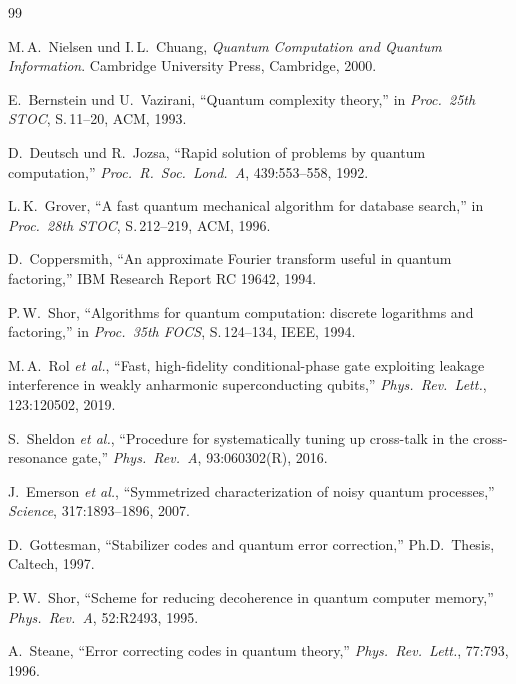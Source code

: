 ﻿\documentclass[11pt,a4paper]{article}
\theoremstyle{definition}
\begin{document}
\begin{thebibliography}{99}

M.\,A.\ Nielsen und I.\,L.\ Chuang,
\textit{Quantum Computation and Quantum Information}.
Cambridge University Press, Cambridge, 2000.

E.\ Bernstein und U.\ Vazirani,
``Quantum complexity theory,''
in \textit{Proc.\ 25th STOC}, S.\,11--20, ACM, 1993.

D.\ Deutsch und R.\ Jozsa,
``Rapid solution of problems by quantum computation,''
\textit{Proc.\ R.\ Soc.\ Lond.\ A}, 439:553--558, 1992.

L.\,K.\ Grover,
``A fast quantum mechanical algorithm for database search,''
in \textit{Proc.\ 28th STOC}, S.\,212--219, ACM, 1996.

D.\ Coppersmith,
``An approximate Fourier transform useful in quantum factoring,''
IBM Research Report RC 19642, 1994.

P.\,W.\ Shor,
``Algorithms for quantum computation: discrete logarithms and factoring,''
in \textit{Proc.\ 35th FOCS}, S.\,124--134, IEEE, 1994.

M.\,A.\ Rol \textit{et al.},
``Fast, high-fidelity conditional-phase gate exploiting leakage interference
in weakly anharmonic superconducting qubits,''
\textit{Phys.\ Rev.\ Lett.}, 123:120502, 2019.

S.\ Sheldon \textit{et al.},
``Procedure for systematically tuning up cross-talk in the cross-resonance gate,''
\textit{Phys.\ Rev.\ A}, 93:060302(R), 2016.

J.\ Emerson \textit{et al.},
``Symmetrized characterization of noisy quantum processes,''
\textit{Science}, 317:1893--1896, 2007.

D.\ Gottesman,
``Stabilizer codes and quantum error correction,''
Ph.D.\ Thesis, Caltech, 1997.

P.\,W.\ Shor,
``Scheme for reducing decoherence in quantum computer memory,''
\textit{Phys.\ Rev.\ A}, 52:R2493, 1995.

A.\ Steane,
``Error correcting codes in quantum theory,''
\textit{Phys.\ Rev.\ Lett.}, 77:793, 1996.


\end{thebibliography}
\end{document}
